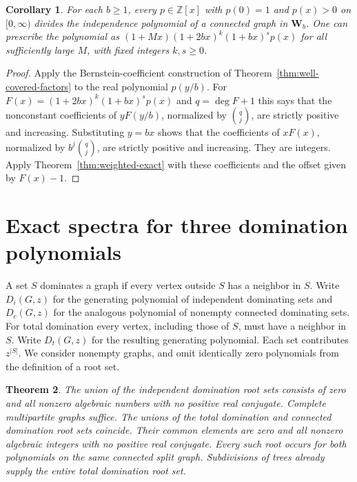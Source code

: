\documentclass[11pt,a4paper]{article}
\newtheorem{theorem}{Theorem}[section]
\newtheorem{corollary}[theorem]{Corollary}
\begin{document}
\begin{corollary}\label{cor:wp-spectrum}
For each $b\ge1$, every $p\in\mathbb Z[x]$ with $p(0)=1$ and
$p(x)>0$ on $[0,\infty)$ divides the independence polynomial of a
connected graph in $\mathbf W_b$. One can prescribe the polynomial as
$(1+Mx)(1+2bx)^k(1+bx)^s p(x)$ for all sufficiently large $M$, with
fixed integers $k,s\ge0$.
\end{corollary}
\begin{proof}
Apply the Bernstein-coefficient construction of
Theorem~\ref{thm:well-covered-factors} to the real polynomial $p(y/b)$.
For $F(x)=(1+2bx)^k(1+bx)^s p(x)$ and $q=\deg F+1$ this says that
the nonconstant coefficients of $yF(y/b)$, normalized by $\binom qj$,
are strictly positive and increasing. Substituting $y=bx$ shows that
the coefficients of $xF(x)$, normalized by $b^j\binom qj$, are strictly
positive and increasing. They are integers. Apply
Theorem~\ref{thm:weighted-exact} with these coefficients and the
offset given by $F(x)-1$.
\end{proof}

\section{Exact spectra for three domination polynomials}
\label{sec:domination}

A set $S$ dominates a graph if every vertex outside $S$ has a neighbor in
$S$. Write $D_i(G,z)$ for the generating polynomial of independent dominating
sets and $D_c(G,z)$ for the analogous polynomial of nonempty connected
dominating sets. For total domination every vertex, including those of $S$,
must have a neighbor in $S$. Write $D_t(G,z)$ for the resulting generating
polynomial. Each set contributes $z^{|S|}$. We consider nonempty graphs,
and omit identically zero polynomials from the definition of a root set.

\begin{theorem}\label{thm:domination-spectra}
The union of the independent domination root sets consists of zero and
all nonzero algebraic numbers with no positive real conjugate.
Complete multipartite graphs suffice.
The unions of the total domination and connected domination root sets
coincide. Their common elements are zero and all nonzero algebraic
integers with no positive real conjugate. Every such root occurs for
both polynomials on the same connected split graph. Subdivisions of trees
already supply the entire total domination root set.
\end{theorem}
\end{document}
